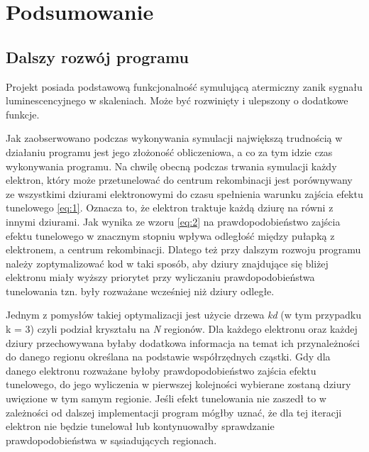 \chapter{Podsumowanie}

\section{Dalszy rozwój programu}
Projekt posiada podstawową funkcjonalność symulującą atermiczny zanik sygnału luminescencyjnego w skaleniach. Może być rozwinięty i ulepszony o dodatkowe funkcje.

Jak zaobserwowano podczas wykonywania symulacji największą trudnością w działaniu programu jest jego złożoność obliczeniowa, a co za tym idzie czas wykonywania programu. Na chwilę obecną podczas trwania symulacji każdy elektron, który może przetunelować do centrum rekombinacji jest porównywany ze wszystkimi dziurami elektronowymi do czasu spełnienia warunku zajścia efektu tunelowego \ref{eq:1}. Oznacza to, że elektron traktuje każdą dziurę na równi z innymi dziurami. Jak wynika ze wzoru \ref{eq:2} na prawdopodobieństwo zajścia efektu tunelowego w znacznym stopniu wpływa odległość między pułapką z elektronem, a centrum rekombinacji. Dlatego też przy dalszym rozwoju programu należy zoptymalizować kod w taki sposób, aby dziury znajdujące się bliżej elektronu miały wyższy priorytet przy wyliczaniu prawdopodobieństwa tunelowania tzn. były rozważane wcześniej niż dziury odległe. 

Jednym z pomysłów takiej optymalizacji jest użycie drzewa \emph{kd} (w tym przypadku k = 3) czyli podział kryształu na \emph{N} regionów. Dla każdego elektronu oraz każdej dziury przechowywana byłaby dodatkowa informacja na temat ich przynależności do danego regionu określana na podstawie współrzędnych cząstki. Gdy dla danego elektronu rozważane byłoby prawdopodobieństwo zajścia efektu tunelowego, do jego wyliczenia w pierwszej kolejności wybierane zostaną dziury uwięzione w tym samym regionie. Jeśli efekt tunelowania nie zaszedł to w zależności od dalszej implementacji program mógłby uznać, że dla tej iteracji elektron nie będzie tunelował lub kontynuowałby sprawdzanie prawdopodobieństwa w sąsiadujących regionach.

